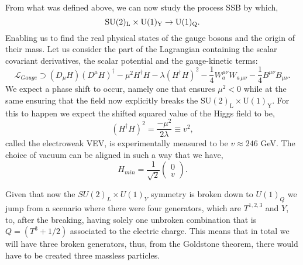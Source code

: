 From what was defined above, we can now study the process SSB by which, 
%
\begin{equation}
\mathrm{SU}(2)_{\mathrm{L}}\times\mathrm{U}(1)_{\mathrm{Y}} \rightarrow \mathrm{U}(1)_{\mathrm{Q}}. 
\end{equation} 
%
Enabling us to find the real physical states of the gauge bosons and the origin of their mass. Let us consider the part of the Lagrangian containing the scalar covariant derivatives, the scalar potential and the gauge-kinetic terms:
%
\begin{equation}
\mathcal{L}_{Gauge} \supset (D_\mu H)(D^\mu H)^\dagger - \mu^2 H^\dagger H - \lambda (H^\dagger H)^2 - \frac{1}{4}  W^{\mu \nu}_a W_{a \,\mu \nu}  
- \frac{1}{4}  B^{\mu \nu} B_{\mu \nu} . 
\label{eq:GaugeSM}
\end{equation} 
% 
We expect a phase shift to occur, namely one that ensures $\mu^2 < 0$ while at the same ensuring that the field now explicitly breaks the $\mathrm{SU(2)_L \times U(1)_Y}$. For this to happen we expect the shifted squared value of the Higgs field to be,
%
\begin{equation}
(H^\dagger H)^2 = \frac{-\mu^2}{2\lambda} \equiv  v^2  , 
\end{equation} 
called the electroweak VEV, is experimentally measured to be $v \approx 246$ GeV. 
%
The choice of vacuum can be aligned in such a way that we have,
\begin{equation}
H_{min} = \frac{1}{\sqrt{2}} \begin{pmatrix} 0 \\
v 
\end{pmatrix}  .
\end{equation}

Given that now the $SU(2)_L \times U(1)_Y$ symmetry is broken down to $U(1)_Q$ we jump from a scenario where there were four generators, which are $T^{1,2,3}$ and $Y$, to, after the breaking, having solely one unbroken combination that is $Q =  (T^3 + 1/2)$ associated to the electric charge. This means that in total we will have three broken generators, thus, from the Goldstone theorem, there would have to be created three massless particles. 

